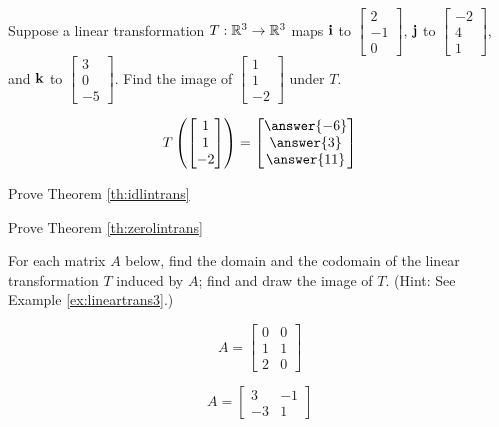 \documentclass{ximera}
\begin{document}
\begin{problem}\label{prob:imagesofijk}
Suppose a linear transformation $T:\mathbb{R}^3\rightarrow\mathbb{R}^3$ maps ${\bf i}$ to $\begin{bmatrix}2\\-1\\0\end{bmatrix}$, ${\bf j}$ to $\begin{bmatrix}-2\\4\\1\end{bmatrix}$, and ${\bf k}$ to $\begin{bmatrix}3\\0\\-5\end{bmatrix}$.  Find the image of $\begin{bmatrix}1\\1\\-2\end{bmatrix}$ under $T$.

$$T\left(\begin{bmatrix}1\\1\\-2\end{bmatrix}\right)=\begin{bmatrix}\answer{-6}\\\answer{3}\\\answer{11}\end{bmatrix}$$
\end{problem}

\begin{problem}\label{prob:idtrans} Prove Theorem \ref{th:idlintrans}\end{problem}

\begin{problem}\label{prob:zerotrans} Prove Theorem \ref{th:zerolintrans}\end{problem}

\begin{problem}
For each matrix $A$ below, find the domain and the codomain of the linear transformation $T$ induced by $A$; find and draw the image of $T$. (Hint: See Example \ref{ex:lineartrans3}.)
  \begin{problem}\label{prob:domaincodomain1}
  $$A=\begin{bmatrix}0&0\\1&1\\2&0\end{bmatrix}$$
  \end{problem}
  \begin{problem}\label{prob:domaincodomain2}
  $$A=\begin{bmatrix}3&-1\\-3&1\end{bmatrix}$$
   \end{problem}
\end{problem}
\end{document}
